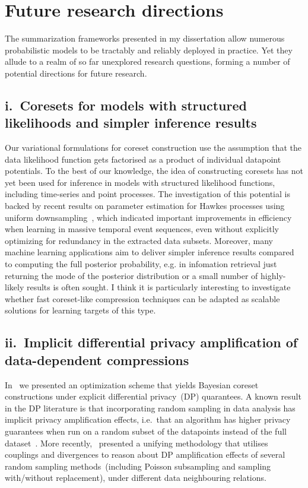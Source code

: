 \documentclass[11pt,a4paper,sans]{moderncv} %
\begin{document}
\section{Future research directions}
\label{sec:future-research-directions}
The summarization frameworks presented in my dissertation allow numerous probabilistic models to be tractably and reliably deployed in practice. Yet they allude to a realm of so far unexplored research questions, forming a number of potential directions for future research.

\subsection{i.~Coresets for models with structured likelihoods and simpler inference results}
\label{subsec:structure-liks}

Our variational formulations for coreset construction use the assumption that the data likelihood function gets factorised as a product of individual datapoint potentials. To the best of our knowledge, the idea of constructing coresets has not yet been used for inference in models with structured likelihood functions, including time-series and point processes. The investigation of this potential is backed by recent results on parameter estimation for Hawkes processes using uniform downsampling~\citep{li19}, which indicated important improvements in efficiency when learning in massive temporal event sequences, even without explicitly optimizing for redundancy in the extracted data subsets. Moreover, many machine learning applications aim to deliver simpler inference results compared to computing the full posterior probability, e.g. in infomation retrieval just returning the mode of the posterior distribution or a small number of highly-likely results is often sought. I think it is particularly interesting to investigate whether fast coreset-like compression techniques can be adapted as scalable solutions for learning targets of this type.

\subsection{ii.~Implicit differential privacy amplification of data-dependent compressions}
\label{subsec:implicit-dp-amplification}

In~\citep{psvi} we presented an optimization scheme that yields Bayesian coreset constructions under explicit differential privacy~(DP) quarantees. A known result in the DP literature is that incorporating random sampling in data analysis has implicit privacy amplification effects, i.e.~that an algorithm has higher privacy guarantees when run on a random subset of the datapoints instead of the full dataset~\citep{li12, beimel13, bassily14, abadi16}. More recently,~\citep{balle18} presented a unifying methodology that utilises couplings and divergences to reason about DP amplification effects of several random sampling methods~(including Poisson subsampling and sampling with/without replacement), under different data neighbouring relations.
\end{document}
